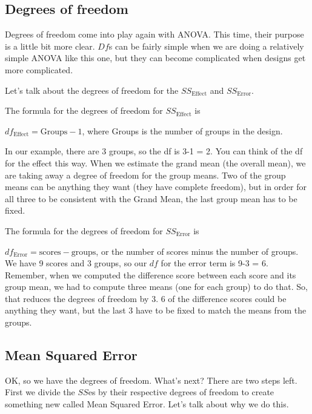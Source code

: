 \documentclass[]{book}
\begin{document}
\hypertarget{degrees-of-freedom}{%
\subsection{Degrees of freedom}\label{degrees-of-freedom}}

Degrees of freedom come into play again with ANOVA. This time, their purpose is a little bit more clear. \(Df\)s can be fairly simple when we are doing a relatively simple ANOVA like this one, but they can become complicated when designs get more complicated.

Let's talk about the degrees of freedom for the \(SS_\text{Effect}\) and \(SS_\text{Error}\).

The formula for the degrees of freedom for \(SS_\text{Effect}\) is

\(df_\text{Effect} = \text{Groups} -1\), where Groups is the number of groups in the design.

In our example, there are 3 groups, so the df is 3-1 = 2. You can think of the df for the effect this way. When we estimate the grand mean (the overall mean), we are taking away a degree of freedom for the group means. Two of the group means can be anything they want (they have complete freedom), but in order for all three to be consistent with the Grand Mean, the last group mean has to be fixed.

The formula for the degrees of freedom for \(SS_\text{Error}\) is

\(df_\text{Error} = \text{scores} - \text{groups}\), or the number of scores minus the number of groups. We have 9 scores and 3 groups, so our \(df\) for the error term is 9-3 = 6. Remember, when we computed the difference score between each score and its group mean, we had to compute three means (one for each group) to do that. So, that reduces the degrees of freedom by 3. 6 of the difference scores could be anything they want, but the last 3 have to be fixed to match the means from the groups.

\hypertarget{mean-squared-error}{%
\subsection{Mean Squared Error}\label{mean-squared-error}}

OK, so we have the degrees of freedom. What's next? There are two steps left. First we divide the \(SS\)es by their respective degrees of freedom to create something new called Mean Squared Error. Let's talk about why we do this.
\end{document}

